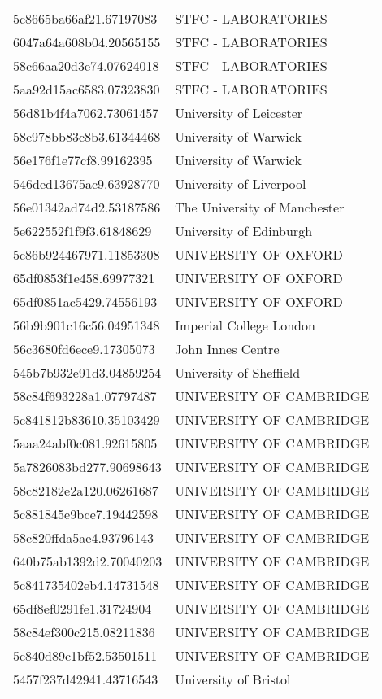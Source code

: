\begin{tabular}{ll}
5c8665ba66af21.67197083 & STFC - LABORATORIES \\
6047a64a608b04.20565155 & STFC - LABORATORIES \\
58c66aa20d3e74.07624018 & STFC - LABORATORIES \\
5aa92d15ac6583.07323830 & STFC - LABORATORIES \\
56d81b4f4a7062.73061457 & University of Leicester \\
58c978bb83c8b3.61344468 & University of Warwick \\
56e176f1e77cf8.99162395 & University of Warwick \\
546ded13675ac9.63928770 & University of Liverpool \\
56e01342ad74d2.53187586 & The University of Manchester \\
5e622552f1f9f3.61848629 & University of Edinburgh \\
5c86b924467971.11853308 & UNIVERSITY OF OXFORD \\
65df0853f1e458.69977321 & UNIVERSITY OF OXFORD \\
65df0851ac5429.74556193 & UNIVERSITY OF OXFORD \\
56b9b901c16c56.04951348 & Imperial College London \\
56c3680fd6ece9.17305073 & John Innes Centre \\
545b7b932e91d3.04859254 & University of Sheffield \\
58c84f693228a1.07797487 & UNIVERSITY OF CAMBRIDGE \\
5c841812b83610.35103429 & UNIVERSITY OF CAMBRIDGE \\
5aaa24abf0c081.92615805 & UNIVERSITY OF CAMBRIDGE \\
5a7826083bd277.90698643 & UNIVERSITY OF CAMBRIDGE \\
58c82182e2a120.06261687 & UNIVERSITY OF CAMBRIDGE \\
5c881845e9bce7.19442598 & UNIVERSITY OF CAMBRIDGE \\
58c820ffda5ae4.93796143 & UNIVERSITY OF CAMBRIDGE \\
640b75ab1392d2.70040203 & UNIVERSITY OF CAMBRIDGE \\
5c841735402eb4.14731548 & UNIVERSITY OF CAMBRIDGE \\
65df8ef0291fe1.31724904 & UNIVERSITY OF CAMBRIDGE \\
58c84ef300c215.08211836 & UNIVERSITY OF CAMBRIDGE \\
5c840d89c1bf52.53501511 & UNIVERSITY OF CAMBRIDGE \\
5457f237d42941.43716543 & University of Bristol \\

\end{tabular}
